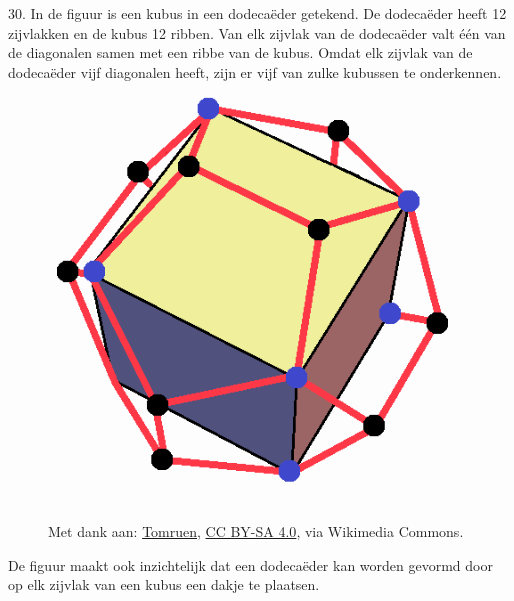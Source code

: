 \clearpage

\begin{problem}{30.}
    In de figuur is een kubus in een dodecaëder getekend. De dode\-caëder heeft 12 zijvlakken en de kubus 12 ribben. Van elk zijvlak van de dodecaëder valt één van de diagonalen samen met een ribbe van de kubus. Omdat elk zijvlak van de dodecaëder vijf diagonalen heeft, zijn er vijf van zulke kubussen te onderkennen.
    \begin{figure}
        \includegraphics[scale=0.28]{resources/Cube_in_dodecahedron}

        \scriptsize{Met dank aan: \href{https://commons.wikimedia.org/wiki/File:Cube_in_dodecahedron.png?uselang=nl}{Tomruen}, \href{https://creativecommons.org/licenses/by-sa/4.0}{CC BY-SA 4.0}, via Wikimedia Commons.}
    \end{figure}
    De figuur maakt ook inzichtelijk dat een dodecaëder kan worden gevormd door op elk zijvlak van een kubus een dakje te plaatsen.
\end{problem}

